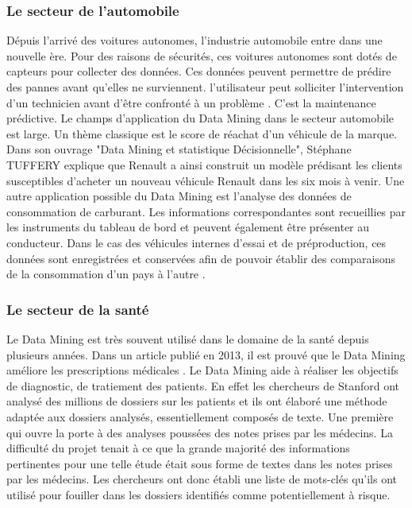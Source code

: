 \documentclass[11pt,a4paper]{report}
\begin{document}
\subsubsection{Le secteur de l'automobile}
Dépuis l'arrivé des voitures autonomes, l'industrie automobile entre dans une nouvelle ère. Pour des raisons de sécurités, ces voitures autonomes sont dotés de capteurs pour collecter des données. Ces données peuvent permettre de prédire des pannes avant qu’elles ne surviennent. l’utilisateur peut solliciter l’intervention d’un technicien avant d’être confronté à un problème \cite{auto_mining}. C’est la maintenance prédictive. 
Le champs d'application du Data Mining dans le secteur automobile est large. Un thème classique est le score de réachat d'un véhicule de la marque. Dans son ouvrage "Data Mining et statistique Décisionnelle", Stéphane TUFFERY explique que Renault a ainsi construit un modèle prédisant les clients susceptibles d'acheter un nouveau véhicule Renault dans les six mois à venir\cite{stephane}.
%
%
Une autre application possible du Data Mining est l’analyse des données de consommation de carburant. Les informations correspondantes sont recueillies par les instruments du tableau de bord et peuvent également être présenter au conducteur. Dans le cas des véhicules internes d’essai et de préproduction, ces données sont enregistrées et conservées afin de pouvoir établir des comparaisons de la consommation d’un pays à l’autre \cite{bmw}.

\subsubsection{Le secteur de la santé}
Le Data Mining est très souvent utilisé dans le domaine de la santé depuis plusieurs années. Dans un article publié en 2013, il est prouvé que le Data Mining améliore les prescriptions médicales \cite{medecine}. Le Data Mining aide à réaliser les objectifs de diagnostic, de tratiement des patients. 
En effet les chercheurs de Stanford ont analysé des millions de dossiers sur les patients et ils ont élaboré une méthode adaptée aux dossiers analysés, essentiellement composés de texte. Une première qui ouvre la porte à des analyses poussées des notes prises par les médecins. La difficulté du projet tenait à ce que la grande majorité des informations pertinentes pour une telle étude était sous forme de textes dans les notes prises par les médecins. Les chercheurs ont donc établi une liste de mots-clés qu’ils ont utilisé pour fouiller dans les dossiers identifiés comme potentiellement à risque.
\end{document}
